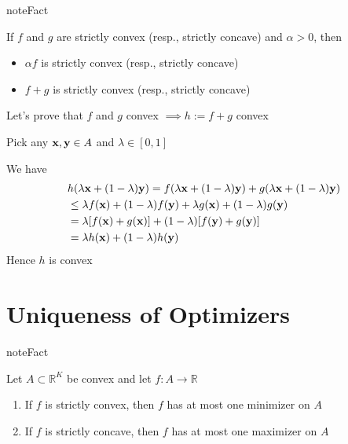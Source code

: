\documentclass[letterpaper,10pt,english]{jupyterBook}
\begin{document}
\begin{sphinxadmonition}{note}{Fact}

\sphinxAtStartPar
If \(f\) and \(g\) are strictly convex (resp., strictly concave) and \(\alpha > 0\), then
\begin{itemize}
\item {} 
\sphinxAtStartPar
\(\alpha f\) is strictly convex (resp., strictly concave)

\item {} 
\sphinxAtStartPar
\(f + g\) is strictly convex (resp., strictly concave)

\end{itemize}
\end{sphinxadmonition}

\sphinxAtStartPar
Let’s prove that \(f\) and \(g\) convex \(\implies h := f + g\) convex

\sphinxAtStartPar
Pick any \({\bf x}, {\bf y} \in A\) and \(\lambda \in [0, 1]\)

\sphinxAtStartPar
We have
\begin{equation*}
\begin{split}
%
& 
h(\lambda {\bf x} + (1 - \lambda) {\bf y})
= f(\lambda {\bf x} + (1 - \lambda) {\bf y})
+ g(\lambda {\bf x} + (1 - \lambda) {\bf y})
\\ &
\leq 
\lambda f({\bf x}) + (1 - \lambda) f({\bf y})
+
\lambda g({\bf x}) + (1 - \lambda) g({\bf y})
\\ &
=
\lambda [f({\bf x}) + g({\bf x})]
+ (1 - \lambda) [f({\bf y}) + g({\bf y})]
\\ &
=
\lambda h({\bf x}) + (1 - \lambda) h({\bf y})
%
\end{split}
\end{equation*}
\sphinxAtStartPar
Hence \(h\) is convex


\section{Uniqueness of Optimizers}
\label{\detokenize{06.optimization_fundamentals:uniqueness-of-optimizers}}
\begin{sphinxadmonition}{note}{Fact}

\sphinxAtStartPar
Let \(A \subset \mathbb{R}^K\) be convex and let \(f \colon A \to \mathbb{R}\)
\begin{enumerate}
%
\item {} 
\sphinxAtStartPar
If \(f\) is strictly convex, then \(f\) has at most one minimizer on \(A\)

\item {} 
\sphinxAtStartPar
If \(f\) is strictly concave, then \(f\) has at most one maximizer on \(A\)

\end{enumerate}
\end{sphinxadmonition}
\end{document}
